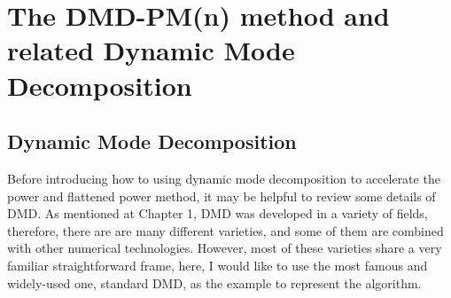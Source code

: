 \cleardoublepage

\chapter{The DMD-PM(n) method and related Dynamic Mode Decomposition}
\label{chapter:DMD-PM}
\section{Dynamic Mode Decomposition}
Before introducing how to using dynamic mode decomposition to accelerate the power and flattened power method, it may be helpful to review some details of DMD.
As mentioned at Chapter 1, DMD was developed in a variety of fields, therefore, there are are many different varieties, and some of them are combined with other numerical technologies. 
However, most of these varieties share a very familiar straightforward frame, here, I would like to use the most famous and widely-used one, standard DMD, as the example to represent the algorithm. 

